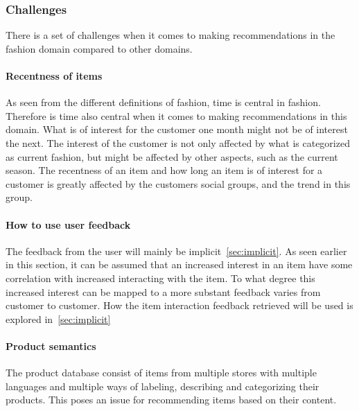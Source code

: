 \subsubsection{Challenges}

There is a set of challenges when it comes to making recommendations in the
fashion domain compared to other domains.

\paragraph{Recentness of items}

As seen from the different definitions of fashion, time is central in fashion.
Therefore is time also central when it comes to making recommendations in this
domain.  What is of interest for the customer one month might not be of
interest the next.  The interest of the customer is not only affected by what
is categorized as current fashion, but might be affected by other aspects, such
as the current season.  The recentness of an item and how long an item is of
interest for a customer is greatly affected by the customers social groups, and
the trend in this group.


\paragraph{How to use user feedback}
The feedback from the user will mainly be implicit~\ref{sec:implicit}.  As seen
earlier in this section, it can be assumed that an increased interest in an
item have some correlation with increased interacting with the item.  To what
degree this increased interest can be mapped to a more substant
 feedback
varies from customer to customer.
How the item interaction feedback retrieved will be used is explored in~\ref{sec:implicit}


\paragraph{Product semantics}

The product database consist of items from multiple stores with multiple
languages and multiple ways of labeling, describing and categorizing their
products.  This poses an issue for recommending items based on their content.


